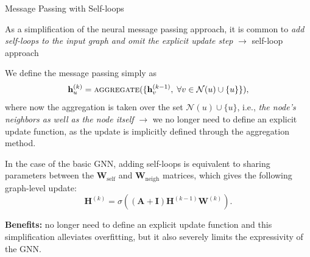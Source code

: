 \documentclass[10pt, aspectratio=169, compress, protectframetitle, handout]{beamer}
\begin{document}
\begin{frame}{Message Passing with Self-loops}

    As a simplification of the neural message passing approach, it is common to \emph{add self-loops to the input graph and omit the explicit update step} $\longrightarrow$ \alert{self-loop approach}
    \medskip
    
    We define the message passing simply as
    \begin{equation}
        \mathbf h^{(k)}_u = \textsc{aggregate}(\{\mathbf h_v^{(k-1)}, \; \forall v \in \mathcal N(u) \cup \{u\}\}),
    \end{equation}
    where now the aggregation is taken over the set $\mathcal N(u) \cup \{u\}$, i.e., \emph{the node's neighbors as well as the node itself} $\longrightarrow$ we no longer need to define an explicit update function, as the update is implicitly defined through the aggregation method.
    \medskip
    
    In the case of the basic GNN, adding self-loops is equivalent to  sharing parameters between the $\mathbf W_\text{self}$ and $\mathbf W_\text{neigh}$ matrices, which gives the following \alert{graph-level update}:
    \begin{equation}
        \mathbf H^{(k)} = \sigma \left( (\mathbf A + \mathbf I) \mathbf H^{(k-1)} \mathbf W^{(k)} \right) .
    \end{equation}
    
    \textbf{Benefits:} no longer need to define an explicit update function and this simplification \alert{alleviates overfitting}, but it also severely \alert{limits the expressivity} of the GNN.

\end{frame}
\end{document}
